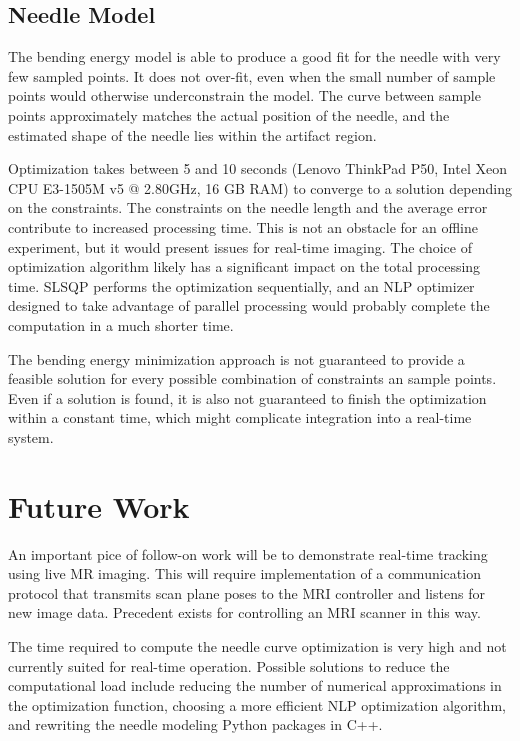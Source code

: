 \subsection{Needle Model}
The bending energy model is able to produce a good fit for the needle with very few sampled points. It does not over-fit, even when the small number of sample points would otherwise underconstrain the model. The curve between sample points approximately matches the actual position of the needle, and the estimated shape of the needle lies within the artifact region.

Optimization takes between 5 and 10 seconds (Lenovo ThinkPad P50, Intel Xeon CPU E3-1505M v5 @ 2.80GHz, 16 GB RAM) to converge to a solution depending on the constraints. The constraints on the needle length and the average error contribute to increased processing time. This is not an obstacle for an offline experiment, but it would present issues for real-time imaging. The choice of optimization algorithm likely has a significant impact on the total processing time. SLSQP performs the optimization sequentially, and an NLP optimizer designed to take advantage of parallel processing would probably complete the computation in a much shorter time.

The bending energy minimization approach is not guaranteed to provide a feasible solution for every possible combination of constraints an sample points. Even if a solution is found, it is also not guaranteed to finish the optimization within a constant time, which might complicate integration into a real-time system.


\section{Future Work}
An important pice of follow-on work will be to demonstrate real-time tracking using live MR imaging. This will require implementation of a communication protocol that transmits scan plane poses to the MRI controller and listens for new image data. Precedent exists for controlling an MRI scanner in this way\cite{patel_closed-loop_2015}.

The time required to compute the needle curve optimization is very high and not currently suited for real-time operation. Possible solutions to reduce the computational load include reducing the number of numerical approximations in the optimization function, choosing a more efficient NLP optimization algorithm, and rewriting the needle modeling Python packages in C++.

